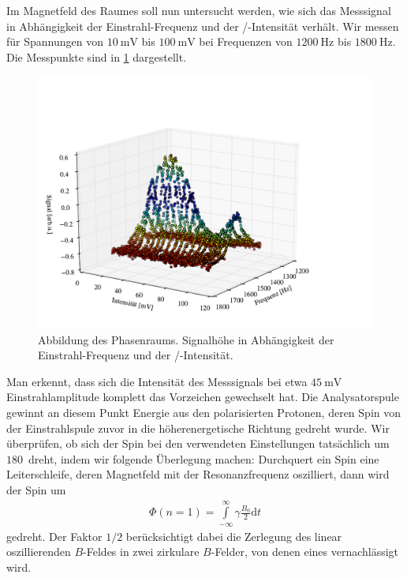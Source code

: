 \documentclass[paper=a4,
	fontsize=10pt,
	DIV=18,
	twocolumn,
	parskip=half
	]{scrartcl}
\numberwithin{equation}{section}    %
\begin{document}
Im Magnetfeld des Raumes soll nun untersucht werden, wie sich das Messsignal in Abhängigkeit der Einstrahl-Frequenz und der /-Intensität verhält.
Wir messen für Spannungen von $\SI{10}{\milli\volt}$ bis $\SI{100}{\milli\volt}$ bei Frequenzen von $\SI{1200}{\hertz}$ bis $\SI{1800}{\hertz}$.
Die Messpunkte sind in \cref{phasenraum} dargestellt.
\begin{figure}[htp]
	\begin{center}
		\includegraphics[width=\columnwidth]{Data-Plots/07-Phasenraum.pdf}
		\caption{Abbildung des Phasenraums. Signalhöhe in Abhängigkeit der Einstrahl-Frequenz und der /-Intensität.}
		\label{phasenraum}
	\end{center}
\end{figure}
Man erkennt, dass sich die Intensität des Messsignals bei etwa $\SI{45}{\milli\volt}$ Einstrahlamplitude komplett das Vorzeichen gewechselt hat. 
Die Analysatorspule gewinnt an diesem Punkt Energie aus den polarisierten Protonen, deren Spin von der Einstrahlspule zuvor in die höherenergetische Richtung gedreht wurde.
Wir überprüfen, ob sich der Spin bei den verwendeten Einstellungen tatsächlich um $180$\textdegree\ dreht, indem wir folgende Überlegung machen:
Durchquert ein Spin eine Leiterschleife, deren Magnetfeld mit der Resonanzfrequenz oszilliert, dann wird der Spin um
\begin{align}
	\Phi(n=1)= \overset{\infty}{\underset{-\infty}{\int}} \gamma \frac{B_0}{2} \mathrm{d}t
\end{align}
gedreht. Der Faktor $1/2$ berücksichtigt dabei die Zerlegung des linear oszillierenden $B$-Feldes in zwei zirkulare $B$-Felder, von denen eines vernachlässigt wird.
\end{document}
